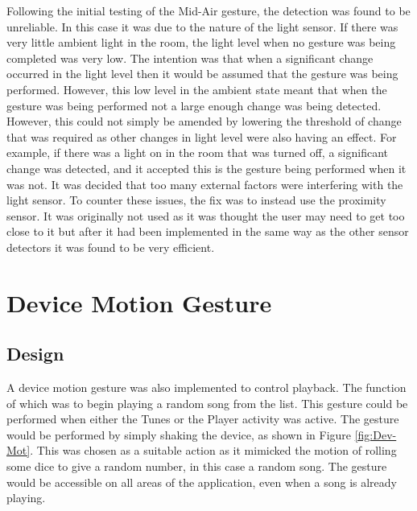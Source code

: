 \documentclass{l4proj}
\begin{document}
Following the initial testing of the Mid-Air gesture, the detection was found to be unreliable. In this case it was due to the nature of the light sensor. If there was very little ambient light in the room, the light level when no gesture was being completed was very low. The intention was that when a significant change occurred in the light level then it would be assumed that the gesture was being performed. However, this low level in the ambient state meant that when the gesture was being performed not a large enough change was being detected. However, this could not simply be amended by lowering the threshold of change that was required as other changes in light level were also having an effect. For example, if there was a light on in the room that was turned off, a significant change was detected, and it accepted this is the gesture being performed when it was not. It was decided that too many external factors were interfering with the light sensor. To counter these issues, the fix was to instead use the proximity sensor. It was originally not used as it was thought the user may need to get too close to it but after it had been implemented in the same way as the other sensor detectors it was found to be very efficient.


\section{Device Motion Gesture}

\subsection{Design}
A device motion gesture was also implemented to control playback. The function of which was to begin playing a random song from the list. This gesture could be performed when either the Tunes or the Player activity was active. The gesture would be performed by simply shaking the device, as shown in Figure \ref{fig:Dev-Mot}. This was chosen as a suitable action as it mimicked the motion of rolling some dice to give a random number, in this case a random song. The gesture would be accessible on all areas of the application, even when a song is already playing.
\end{document}
